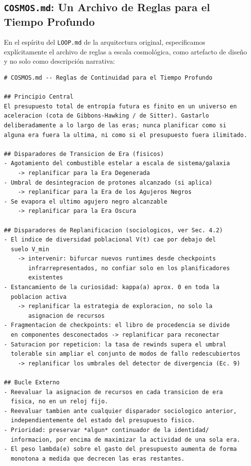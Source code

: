 \documentclass[11pt]{article}
\begin{document}
\subsection{\texttt{COSMOS.md}: Un Archivo de Reglas para el Tiempo Profundo}

En el espíritu del \texttt{LOOP.md} de la arquitectura original, especificamos explícitamente el archivo de reglas a escala cosmológica, como artefacto de diseño y no solo como descripción narrativa:

\begin{lstlisting}
# COSMOS.md -- Reglas de Continuidad para el Tiempo Profundo

## Principio Central
El presupuesto total de entropía futura es finito en un universo en
aceleracion (cota de Gibbons-Hawking / de Sitter). Gastarlo
deliberadamente a lo largo de las eras; nunca planificar como si
alguna era fuera la ultima, ni como si el presupuesto fuera ilimitado.

## Disparadores de Transicion de Era (fisicos)
- Agotamiento del combustible estelar a escala de sistema/galaxia
    -> replanificar para la Era Degenerada
- Umbral de desintegracion de protones alcanzado (si aplica)
    -> replanificar para la Era de los Agujeros Negros
- Se evapora el ultimo agujero negro alcanzable
    -> replanificar para la Era Oscura

## Disparadores de Replanificacion (sociologicos, ver Sec. 4.2)
- El indice de diversidad poblacional V(t) cae por debajo del
  suelo V_min
    -> intervenir: bifurcar nuevos runtimes desde checkpoints
       infrarrepresentados, no confiar solo en los planificadores
       existentes
- Estancamiento de la curiosidad: kappa(a) aprox. 0 en toda la
  poblacion activa
    -> replanificar la estrategia de exploracion, no solo la
       asignacion de recursos
- Fragmentacion de checkpoints: el libro de procedencia se divide
  en componentes desconectados -> replanificar para reconectar
- Saturacion por repeticion: la tasa de rewinds supera el umbral
  tolerable sin ampliar el conjunto de modos de fallo redescubiertos
    -> replanificar los umbrales del detector de divergencia (Ec. 9)

## Bucle Externo
- Reevaluar la asignacion de recursos en cada transicion de era
  fisica, no en un reloj fijo.
- Reevaluar tambien ante cualquier disparador sociologico anterior,
  independientemente del estado del presupuesto fisico.
- Prioridad: preservar *algun* continuador de la identidad/
  informacion, por encima de maximizar la actividad de una sola era.
- El peso lambda(e) sobre el gasto del presupuesto aumenta de forma
  monotona a medida que decrecen las eras restantes.


\end{lstlisting}
\end{document}
